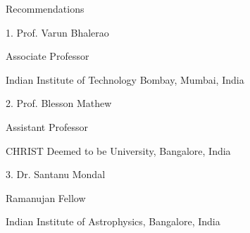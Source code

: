 \begin{section}{Recommendations}
    \begin{subsectionnobullet}{1. Prof. Varun Bhalerao}{}{}{}
        \item{Associate Professor}
        \item{Indian Institute of Technology Bombay, Mumbai, India}
    \end{subsectionnobullet}
        
    \begin{subsectionnobullet}{2. Prof. Blesson Mathew}{}{}{}
        \item{Assistant Professor}
        \item{CHRIST Deemed to be University, Bangalore, India}
    \end{subsectionnobullet}
        
    \begin{subsectionnobullet}{3. Dr. Santanu Mondal}{}{}{}
        \item{Ramanujan Fellow}
        \item{Indian Institute of Astrophysics, Bangalore, India}
    \end{subsectionnobullet}

\end{section}